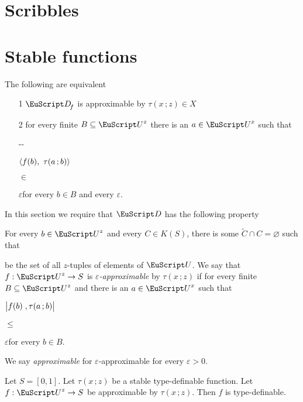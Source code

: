 \section{Scribbles}


\section{Stable functions}
\def\medrel#1{\parbox{5ex}{\hfil $#1$}}
\def\ceq#1#2#3{\parbox[t]{33ex}{$\displaystyle #1$}\medrel{#2}{$\displaystyle #3$}}


\begin{fact}
  The following are equivalent
  \begin{itemize}
    \item [1] ${\EuScript D\!}_f$ is approximable by $\tau(x\,;z)\in X$
    \item [2] for every finite $B\subseteq{\EuScript U}^{z}$ there is an $a\in{\EuScript U}^{x}$ such that\smallskip
    
    \noindent\kern-\kern-
    \ceq{\hfill\langle f(b),\ \tau(a\,;b)\rangle}{\in}{\varepsilon}\hfill for every $b\in B$ and every $\varepsilon$.
  \end{itemize}
  
\end{fact}

In this section we require that ${\EuScript D}$ has the following property

For every $b\in{\EuScript U}^z$ and every $C\in K(S)$, there is some $\tilde C\cap C=\varnothing$ such that

be the set of all $z$-tuples of elements of ${\EuScript U}$.
We say that $f:{\EuScript U}^{z}\to S$ is \emph{$\varepsilon$-approximable\/} by $\tau(x\,;z)$ if for every finite $B\subseteq{\EuScript U}^z$ and there is an $a\in{\EuScript U}^x$ such that

\ceq{\hfill \big|f(b)\;,\tau(a\,;b)\big|}{\le}{\varepsilon}\hfill for every $b\in B$.

We say \emph{approximable\/} for $\varepsilon$-approximable for every $\varepsilon>0$.

\begin{theorem}
  Let $S=[0,1]$.
  Let $\tau(x\,;z)$ be a stable type-definable function.
  Let $f:{\EuScript U}^{z}\to S$ be approximable by $\tau(x\,;z)$.
  Then $f$ is type-definable. 
\end{theorem}

